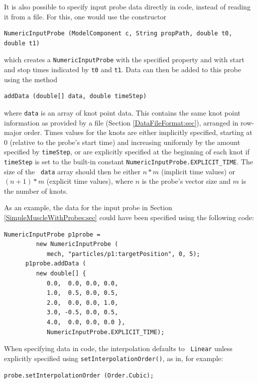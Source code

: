 It is also possible to specify input probe data directly in code,
instead of reading it from a file. For this, one would use the
constructor
\begin{lstlisting}[]
   NumericInputProbe (ModelComponent c, String propPath, double t0, double t1)
\end{lstlisting}
%
which creates a {\tt NumericInputProbe} with the specified property
and with start and stop times indicated by {\tt t0} and {\tt t1}.
Data can then be added to this probe using the method
\begin{lstlisting}[]
   addData (double[] data, double timeStep)
\end{lstlisting}
%
where {\tt data} is an array of knot point data. This contains the
same knot point information as provided by a file (Section
\ref{DataFileFormat:sec}), arranged in row-major order.  Times values
for the knots are either implicitly specified, starting at 0 (relative
to the probe's start time) and increasing uniformly by the amount
specified by {\tt timeStep}, or are explicitly specified at the
beginning of each knot if {\tt timeStep} is set to the built-in
constant {\tt NumericInputProbe.EXPLICIT\_TIME}. The size of the {\tt
data} array should then be either $n*m$ (implicit time values) or
$(n+1)*m$ (explicit time values), where $n$ is the probe's vector size
and $m$ is the number of knots.

As an example, the data for the input probe in Section
\ref{SimpleMuscleWithProbes:sec} could have been specified
using the following code:
%
\begin{lstlisting}[]
      NumericInputProbe p1probe =
         new NumericInputProbe (
            mech, "particles/p1:targetPosition", 0, 5);
      p1probe.addData (
         new double[] {
            0.0,  0.0, 0.0, 0.0,
            1.0,  0.5, 0.0, 0.5,
            2.0,  0.0, 0.0, 1.0,
            3.0, -0.5, 0.0, 0.5,
            4.0,  0.0, 0.0, 0.0 },
            NumericInputProbe.EXPLICIT_TIME);
\end{lstlisting}

When specifying data in code, the interpolation defaults to {\tt
Linear} unless explicitly specified using\pdfbreak
{\tt setInterpolationOrder()}, as in, for example:
%
\begin{lstlisting}[]
   probe.setInterpolationOrder (Order.Cubic);
\end{lstlisting}
%

